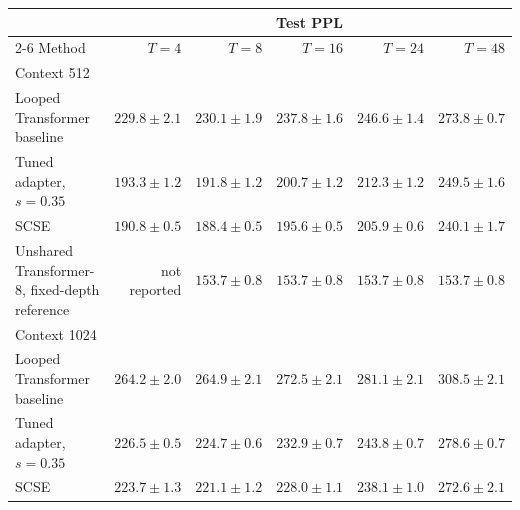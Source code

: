 \documentclass[letterpaper]{article} %
\newcommand{\SCSE}{\textsc{SCSE}}
\theoremstyle{remark}
\begin{document}
\begin{table}[t!]
	\centering
	\small
	\begin{tabular}{lrrrrr}
		\toprule
		                                              & \multicolumn{5}{c}{Test PPL}                                                                                                     \\
		\cmidrule(lr){2-6}
		Method                                        & $T=4$                        & $T=8$                  & $T=16$                 & $T=24$                 & $T=48$                 \\
		\midrule
		\multicolumn{6}{l}{Context 512}                                                                                                                                                  \\
		Looped Transformer baseline                   & $229.8\pm2.1$                & $230.1\pm1.9$          & $237.8\pm1.6$          & $246.6\pm1.4$          & $273.8\pm0.7$          \\
		Tuned adapter, $s=0.35$                       & $193.3\pm1.2$                & $191.8\pm1.2$          & $200.7\pm1.2$          & $212.3\pm1.2$          & $249.5\pm1.6$          \\
		\SCSE{}                                       & $\mathbf{190.8\pm0.5}$       & $\mathbf{188.4\pm0.5}$ & $\mathbf{195.6\pm0.5}$ & $\mathbf{205.9\pm0.6}$ & $\mathbf{240.1\pm1.7}$ \\
		\addlinespace[2pt]
		Unshared Transformer-8, fixed-depth reference & not reported                 & $153.7\pm0.8$          & $153.7\pm0.8$          & $153.7\pm0.8$          & $153.7\pm0.8$          \\
		\midrule
		\multicolumn{6}{l}{Context 1024}                                                                                                                                                 \\
		Looped Transformer baseline                   & $264.2\pm2.0$                & $264.9\pm2.1$          & $272.5\pm2.1$          & $281.1\pm2.1$          & $308.5\pm2.1$          \\
		Tuned adapter, $s=0.35$                       & $226.5\pm0.5$                & $224.7\pm0.6$          & $232.9\pm0.7$          & $243.8\pm0.7$          & $278.6\pm0.7$          \\
		\SCSE{}                                       & $\mathbf{223.7\pm1.3}$       & $\mathbf{221.1\pm1.2}$ & $\mathbf{228.0\pm1.1}$ & $\mathbf{238.1\pm1.0}$ & $\mathbf{272.6\pm2.1}$ \\

\end{tabular}
\end{table}
\end{document}
